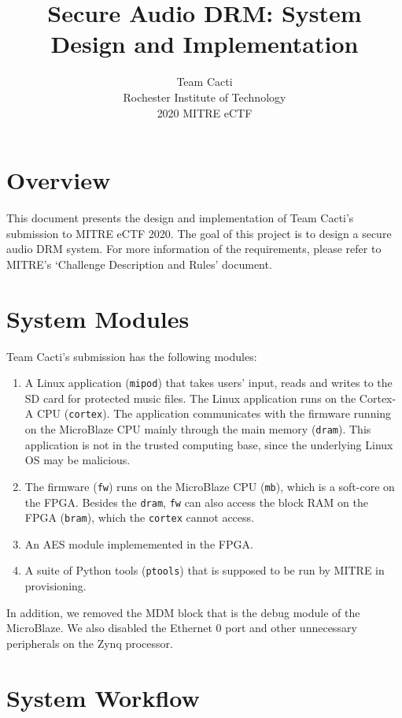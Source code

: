 \documentclass[11pt]{extarticle}
\title{Secure Audio DRM: System Design and Implementation}
\author{Team Cacti\\Rochester Institute of Technology\\ 2020 MITRE eCTF}
\date{}
\begin{document}
\maketitle

\section{Overview}

This document presents the design and implementation of Team Cacti's submission to MITRE eCTF 2020.
The goal of this project is to design a secure audio DRM system. For more information of the requirements, please refer to MITRE's `Challenge Description and Rules' document. 

\section{System Modules}

Team Cacti's submission has the following modules: 

\begin{enumerate}
	\item A Linux application (\verb|mipod|) that takes users' input, reads and writes to the SD card for protected music files. The Linux application runs on the Cortex-A CPU (\verb|cortex|). The application communicates with the firmware running on the MicroBlaze CPU mainly through the main memory (\verb|dram|).
	This application is not in the trusted computing base, since the underlying Linux OS may be malicious.
	\item The firmware (\verb|fw|) runs on the MicroBlaze CPU (\verb|mb|), which is a soft-core on the FPGA. Besides the \verb|dram|, \verb|fw| can also access the block RAM on the FPGA (\verb|bram|), which the \verb|cortex| cannot access.
	\item An AES module implememented in the FPGA.
	\item A suite of Python tools (\verb|ptools|) that is supposed to be run by MITRE in provisioning.
\end{enumerate}

In addition, we removed the MDM block that is the debug module of the MicroBlaze. 
We also disabled the Ethernet 0 port and other unnecessary peripherals on the Zynq processor.

\section{System Workflow}
\end{document}
